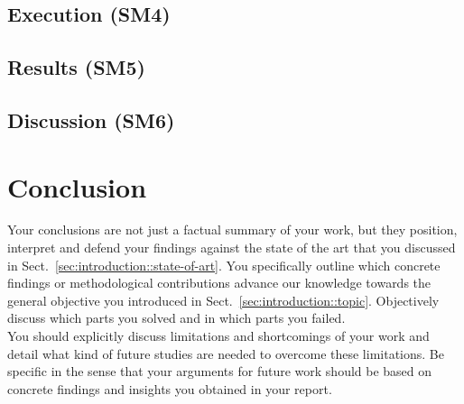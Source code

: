 \documentclass[
	a4paper,
	pagesize,
	pdftex,
	12pt,
	ngerman,
	fleqn,
	final,
	]{scrartcl}
\theoremstyle{definition}
\begin{document}
	\subsection{Execution (SM4)}
	
	\subsection{Results (SM5)}
	
	\subsection{Discussion (SM6)}

\section{Conclusion}
		Your conclusions are not just a factual summary of your work, but they position, interpret and defend your findings against the state of the art that you discussed in Sect.~\ref{sec:introduction::state-of-art}. You specifically outline which concrete findings or methodological contributions advance our knowledge towards the general objective you introduced in Sect.~\ref{sec:introduction::topic}. Objectively discuss which parts you solved and in which parts you failed. \\
		You should explicitly discuss limitations and shortcomings of your work and detail what kind of future studies are needed to overcome these limitations. Be specific in the sense that your arguments for future work should be based on concrete findings and insights you obtained in your report.






\selbstaendigkeitserklaerung{\today}
\end{document}
